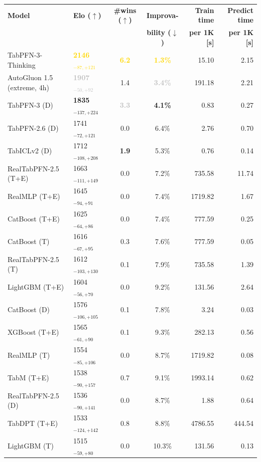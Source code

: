 \begin{tabular}{llccrr}
\toprule
\textbf{Model} & \textbf{Elo ($\uparrow$)} & \textbf{\#wins ($\uparrow$)} & \textbf{Improva-} & \textbf{Train time} & \textbf{Predict time} \\
 &  &  & \textbf{bility ($\downarrow$)} & \textbf{per 1K [s]} & \textbf{per 1K [s]} \\
\midrule
TabPFN-3-Thinking & \textcolor{gold}{\textbf{2146${}_{-87,+121}$}} & \textcolor{gold}{\textbf{6.2}} & \textcolor{gold}{\textbf{1.3\%}} & 15.10 & 2.15 \\
AutoGluon 1.5 (extreme, 4h) & \textcolor{silver}{\textbf{1907${}_{-50,+92}$}} & 1.4 & \textcolor{silver}{\textbf{3.4\%}} & 191.18 & 2.21 \\
TabPFN-3 (D) & \textcolor{bronze}{\textbf{1835${}_{-137,+224}$}} & \textcolor{silver}{\textbf{3.3}} & \textcolor{bronze}{\textbf{4.1\%}} & 0.83 & 0.27 \\
TabPFN-2.6 (D) & 1741${}_{-72,+121}$ & 0.0 & 6.4\% & 2.76 & 0.70 \\
TabICLv2 (D) & 1712${}_{-108,+208}$ & \textcolor{bronze}{\textbf{1.9}} & 5.3\% & 0.76 & 0.14 \\
RealTabPFN-2.5 (T+E) & 1663${}_{-111,+149}$ & 0.0 & 7.2\% & 735.58 & 11.74 \\
RealMLP (T+E) & 1645${}_{-94,+91}$ & 0.0 & 7.4\% & 1719.82 & 1.67 \\
CatBoost (T+E) & 1625${}_{-64,+86}$ & 0.0 & 7.4\% & 777.59 & 0.25 \\
CatBoost (T) & 1616${}_{-67,+95}$ & 0.3 & 7.6\% & 777.59 & 0.05 \\
RealTabPFN-2.5 (T) & 1612${}_{-103,+130}$ & 0.1 & 7.9\% & 735.58 & 1.39 \\
LightGBM (T+E) & 1604${}_{-56,+70}$ & 0.0 & 9.2\% & 131.56 & 2.64 \\
CatBoost (D) & 1576${}_{-106,+105}$ & 0.1 & 7.8\% & 3.24 & 0.03 \\
XGBoost (T+E) & 1565${}_{-61,+90}$ & 0.1 & 9.3\% & 282.13 & 0.56 \\
RealMLP (T) & 1554${}_{-85,+106}$ & 0.0 & 8.7\% & 1719.82 & 0.08 \\
TabM (T+E) & 1538${}_{-90,+157}$ & 0.7 & 9.1\% & 1993.14 & 0.62 \\
RealTabPFN-2.5 (D) & 1536${}_{-90,+141}$ & 0.0 & 8.7\% & 1.88 & 0.64 \\
TabDPT (T+E) & 1533${}_{-124,+142}$ & 0.8 & 8.8\% & 4786.55 & 444.54 \\
LightGBM (T) & 1515${}_{-59,+80}$ & 0.0 & 10.3\% & 131.56 & 0.13 \\

\end{tabular}
